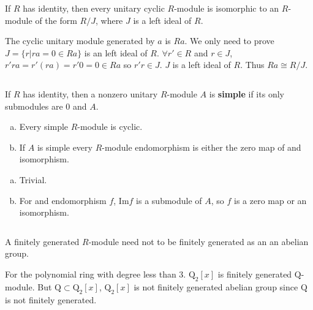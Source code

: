 $$ $$

\begin{ex}
    If $R$ has identity, then every unitary cyclic $R$-module is isomorphic to an $R$-module of the form $R /J$, where $J$ is a left ideal of $R$.
\end{ex}

\begin{answer}
    The cyclic unitary module generated by $a$ is $Ra$. We only need to prove $J=\{r|ra=0\in Ra\}$ is an left ideal of $R$. $\forall r'\in R$ and $r\in J$, $r'ra=r'(ra)=r'0=0\in Ra$ so $r'r\in J$. $J$ is a left ideal of $R$. Thus $Ra\cong R /J$.
\end{answer}

$$ $$

\begin{ex}
    If $R$ has identity, then a nonzero unitary $R$-module $A$ is \textbf{simple} if its only submodules are 0 and $A$.
    \begin{enumerate}[(a)]
        \item Every simple $R$-module is cyclic.
        \item If $A$ is simple every $R$-module endomorphism is either the zero map of and isomorphism.
    \end{enumerate}
\end{ex}

\begin{answer}
    \begin{enumerate}[(a)]
        \item Trivial.
        \item For and endomorphism $f$, $\mathrm{Im}f$ is a submodule of $A$, so $f$ is a zero map or an isomorphism.
    \end{enumerate}
\end{answer}

$$ $$

\begin{ex}
    A finitely generated $R$-module need not to be finitely generated as an an abelian group.
\end{ex}

\begin{answer}
    For the polynomial ring with degree less than 3. $\mathrm{Q}_{2}[x]$ is finitely generated  $\mathrm{Q}$-module. But $\mathrm{Q}\subset \mathrm{Q}_{2}[x]$, $\mathrm{Q}_{2}[x]$ is not finitely generated abelian group since $\mathrm{Q}$ is not finitely generated.
\end{answer}

$$ $$

